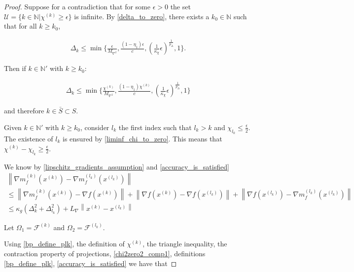 \documentclass{article}
\theoremstyle{case}
\numberwithin{theorem}{subsection}
\newcommand{\chik}{{\chi^{(k)}}}
\newcommand{\dk}{\Delta_k}
\newcommand{\feasiblek}{{\mathcal F^{(k)}}}
\newcommand{\gk}{{\nabla m_f^{(k)}(x^{(k)})}}
\newcommand{\gradf}{\nabla f}
\newcommand{\lipgrad}{{L_{\nabla}}}
\newcommand{\maxhessian}{{M_{\nabla^2}}}
\newcommand{\naturals}{\mathbb N}
\newcommand{\xk}{{x^{(k)}}}
\begin{document}
\begin{proof}
Suppose for a contradiction that for some $\epsilon > 0$ the set $\mathcal U = \{k \in \naturals | \chik \ge \epsilon \}$ is infinite.
By \cref{delta_to_zero}, there exists a $k_0 \in \naturals$ such that for all $k \ge k_0$,

\begin{align*}
\dk \le \min\{\frac{\epsilon}{\maxhessian}, \frac{(1-\eta_1)\epsilon}{c}, \left(\frac 1 {\kappa_{\chi}}  \epsilon \right)^{\frac 1 {p_{\Delta}}}, 1\}.
\end{align*}

Then if $k \in \naturals '$ with $k \ge k_0$:

\begin{align*}
\dk \le \min\{\frac{\chik}{\maxhessian}, \frac{(1-\eta_1)\chik}{c}, \left(\frac 1 {\kappa_{\chi}}  \epsilon \right)^{\frac 1 {p_{\Delta}}}, 1\}
\end{align*}

and therefore $k \in \bar S \subset S$.

Given $k \in \naturals'$ with $k\ge k_0$, consider $l_k$ the first index such that $l_k > k$ and $\chi_{l_k} \le \frac{\epsilon} 2$.
The existence of $l_k$ is ensured by \cref{liminf_chi_to_zero}.
This means that $\chik - \chi_{l_k} \ge \frac {\epsilon} 2 $.

We know by \cref{lipschitz_gradients_assumption} and \cref{accuracy_is_satisfied}
\begin{align}
\left\|\gk - {\nabla m_f^{(l_k)}\left(x^{(l_k)}\right)}\right\| \nonumber \\
\le \left\|\gk - \gradf(\xk)\right\| + \left\|\gradf(\xk) - \gradf(x^{(l_k)})\right\| + \left\|\gradf(x^{(l_k)}) - {\nabla m_f^{(l_k)}\left(x^{(l_k)}\right)}\right\| \nonumber \\
\le \kappa_g \left(\dk^2 + \Delta_{l_k}^2\right) + \lipgrad \left\|\xk - x^{(l_k)} \right\| \label{chi2zero2_comp1}
\end{align}


Let $\Omega_1 = \feasiblek$ and $\Omega_2 = \mathcal F^{(l_k)}$.

Using \cref{bp_define_plk}, the definition of $\chik$, the triangle inequality, the contraction property of projections, \cref{chi2zero2_comp1},
definitions \cref{bp_define_plk}, \cref{accuracy_is_satisfied} we have that


\end{proof}
\end{document}
